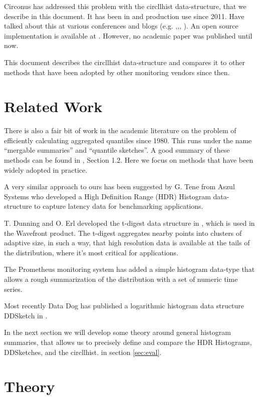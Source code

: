 \documentclass{article}
\theoremstyle{plain}
\theoremstyle{remark}
\begin{document}
Circonus has addressed this problem with the circllhist data-structure, that we describe in this document.
It has been in and production use since 2011.
Have talked about this at various conferences and blogs (e.g. \cite{TS0},\cite{TS1},\cite{TS2}, \cite{HH1}).
An open source implementation is available at \cite{libcircllhist}.
However, no academic paper was published until now.

This document describes the circllhist data-structure and compares it to other methods
that have been adopted by other monitoring vendors since then.

\section{Related Work} \label{sec:rw}

There is also a fair bit of work in the academic literature on the problem of efficiently
calculating aggregated quantiles since 1980. This runs under the name ``mergable summaries'' and
``quantile sketches''. A good summary of these methods can be found in \cite{dd}, Section 1.2.
Here we focus on methods that have been widely adopted in practice.

A very similar approach to ours has been suggested by G. Tene from Aszul Systems who developed
a High Definition Range (HDR) Histogram data-structure \cite{hdr} to capture latency
data for benchmarking applications.

T. Dunning and O. Erl developed the t-digest data structure in \cite{tdigest}, which is used in the
Wavefront product. The t-digest aggregates nearby points into clusters of adaptive size, in such a
way, that high resolution data is available at the tails of the distribution, where it's most
critical for applications.

The Prometheus monitoring system \cite{prom} has added a simple histogram data-type that allows a
rough summarization of the distribution with a set of numeric time series.

Most recently Data Dog has published a logarithmic histogram data structure DDSketch in \cite{dd}.

In the next section we will develop some theory around general histogram summaries, that allows
us to precisely define and compare the HDR Histograms, DDSketches, and the circllhist.
in section \ref{sec:eval}.

\section{Theory}
\end{document}
